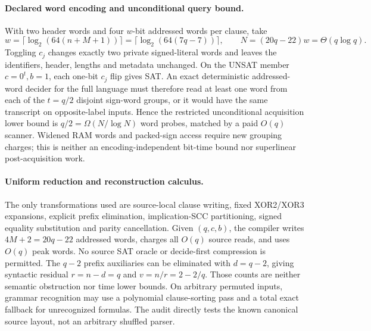 \documentclass[11pt]{article}
\begin{document}
\paragraph{Declared word encoding and unconditional query bound.}
With two header words and four $w$-bit addressed words per clause, take
\[
w=\lceil\log_2(64(n+M+1))\rceil
=\lceil\log_2(64(7q-7))\rceil,\qquad
N=(20q-22)w=\Theta(q\log q).
\tag{6}
\]
Toggling $c_j$ changes exactly two private signed-literal words and leaves the identifiers, header, lengths and metadata unchanged. On the UNSAT member $c=0^t,b=1$, each one-bit $c_j$ flip gives SAT. An exact deterministic addressed-word decider for the full language must therefore read at least one word from each of the $t=q/2$ disjoint sign-word groups, or it would have the same transcript on opposite-label inputs. Hence the restricted unconditional acquisition lower bound is $q/2=\Omega(N/\log N)$ word probes, matched by a paid $O(q)$ scanner. Widened RAM words and packed-sign access require new grouping charges; this is neither an encoding-independent bit-time bound nor superlinear post-acquisition work.

\paragraph{Uniform reduction and reconstruction calculus.}
The only transformations used are source-local clause writing, fixed XOR2/XOR3 expansions, explicit prefix elimination, implication-SCC partitioning, signed equality substitution and parity cancellation. Given $(q,c,b)$, the compiler writes $4M+2=20q-22$ addressed words, charges all $O(q)$ source reads, and uses $O(q)$ peak words. No source SAT oracle or decide-first compression is permitted. The $q-2$ prefix auxiliaries can be eliminated with $d=q-2$, giving syntactic residual $r=n-d=q$ and $v=n/r=2-2/q$. Those counts are neither semantic obstruction nor time lower bounds. On arbitrary permuted inputs, grammar recognition may use a polynomial clause-sorting pass and a total exact fallback for unrecognized formulas. The audit directly tests the known canonical source layout, not an arbitrary shuffled parser.
\end{document}
